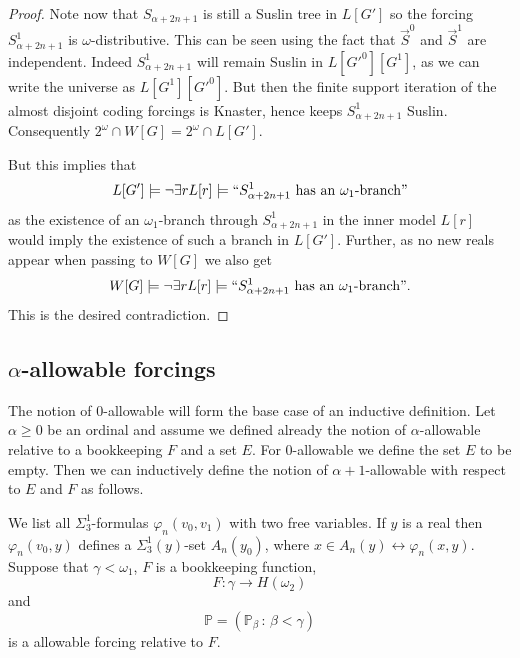 \documentclass[a4paper,11pt]{article}
\newcommand{\forceP}{\mathbb{P}}
\begin{document}
\begin{proof}
Note now that $S_{\alpha+2n+1}$ is still a Suslin tree in $L[G']$ so the forcing $S^1_{\alpha+2n+1}$ is $\omega$-distributive. This can be seen using the fact that $\vec{S}^0$ and $\vec{S}^1$ are independent. Indeed $S^1_{\alpha+2n+1}$ will remain Suslin in $L[G'^0][G^1]$, as we can write the universe as $L[G^1] [G'^0]$. But then the finite support iteration of the almost disjoint coding forcings is Knaster, hence keeps $S^1_{\alpha+2n+1}$ Suslin. Consequently $2^{\omega} \cap W[G] = 2^{\omega} \cap L[G']$. 

 But this implies that 
\[L[G'] \models \lnot \exists r L[r] \models `` S^1_{\alpha+2n+1} \text{ has an $\omega_1$-branch}" \]
as the existence of an $\omega_1$-branch through $S^1_{\alpha+2n+1}$ in the inner model $L[r]$ would imply the existence of such a branch in $L[G']$. Further, as no new reals appear when passing to $W[G]$ we also get 
\[W[G] \models \lnot \exists r L[r] \models `` S^1_{\alpha+2n+1} \text{ has an $\omega_1$-branch}". \]
This is the desired contradiction.

\end{proof}




\subsection{$\alpha$-allowable forcings}



The notion of 0-allowable will form the base case of an inductive definition.
Let $\alpha \ge 0$ be an ordinal and assume we defined already the notion of $\alpha$-allowable relative to a bookkeeping $F$ and a set $E$. For $0$-allowable we define the set $E$ to be empty. Then we can inductively define the notion of $\alpha+1$-allowable with respect to $E$ and $F$  as follows.

We list all  ${\Sigma}^1_3$-formulas $\varphi_n (v_0,v_1)$ with two free variables. If $y$ is a real then $\varphi_n(v_0,y)$ defines a $\Sigma^1_3(y)$-set $A_n(y_0)$, where $x \in A_n(y) \leftrightarrow \varphi_n(x,y)$.
Suppose that $\gamma < \omega_1$, $F$ is a bookkeeping function,  \[F: \gamma \rightarrow H(\omega_2) \] and \[\forceP=(\forceP_{\beta} \, : \, \beta < \gamma)\] is a allowable forcing relative to $F$.
\end{document}
